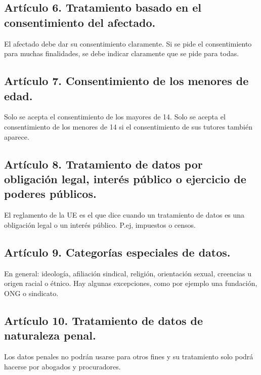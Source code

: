 \documentclass[letterpaper,10pt,spanish]{sphinxmanual}
\begin{document}
\subsection{Artículo 6. Tratamiento basado en el consentimiento del afectado.}
\label{\detokenize{tema_lopd/tema_lopd:articulo-6-tratamiento-basado-en-el-consentimiento-del-afectado}}
El afectado debe dar su consentimiento claramente. Si se pide el consentimiento para muchas finalidades, se debe indicar claramente que se pide para todas. 


\subsection{Artículo 7. Consentimiento de los menores de edad.}
\label{\detokenize{tema_lopd/tema_lopd:articulo-7-consentimiento-de-los-menores-de-edad}}
Solo se acepta el consentimiento de los mayores de 14. Solo se acepta el consentimiento de los menores de 14 si el consentimiento de sus tutores también aparece.


\subsection{Artículo 8. Tratamiento de datos por obligación legal, interés público o ejercicio de poderes públicos.}
\label{\detokenize{tema_lopd/tema_lopd:articulo-8-tratamiento-de-datos-por-obligacion-legal-interes-publico-o-ejercicio-de-poderes-publicos}}
El reglamento de la UE es el que dice cuando un tratamiento de datos es una obligación legal o un interés público. P.ej, impuestos o censos.


\subsection{Artículo 9. Categorías especiales de datos.}
\label{\detokenize{tema_lopd/tema_lopd:articulo-9-categorias-especiales-de-datos}}
En general: ideología, afiliación sindical, religión, orientación sexual, creencias u origen racial o étnico. Hay algunas excepciones, como por ejemplo una fundación, ONG o sindicato.


\subsection{Artículo 10. Tratamiento de datos de naturaleza penal.}
\label{\detokenize{tema_lopd/tema_lopd:articulo-10-tratamiento-de-datos-de-naturaleza-penal}}
Los datos penales no podrán usarse para otros fines y su tratamiento solo podrá hacerse por abogados y procuradores.
\end{document}
